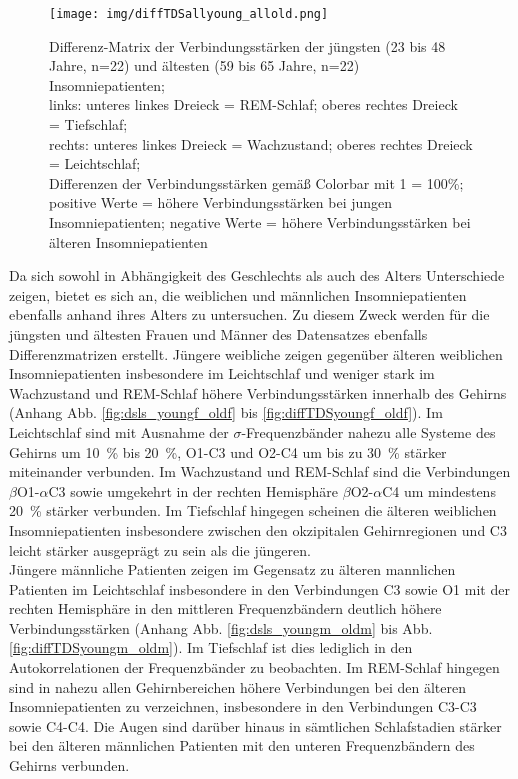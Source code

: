 \begin{figure}[H]
	\centering
	\texttt{[image: img/diffTDSallyoung\_allold.png]}
	\caption[Differenz-Matrix der Verbindungsstärken der jungen und älteren Insomniepatienten]{Differenz-Matrix der Verbindungsstärken der jüngsten (23 bis 48 Jahre, n=22) und ältesten (59 bis 65 Jahre, n=22) Insomniepatienten;\\links: unteres linkes Dreieck = REM-Schlaf; oberes rechtes Dreieck = Tiefschlaf;\\rechts: unteres linkes Dreieck = Wachzustand; oberes rechtes Dreieck = Leichtschlaf;\\Differenzen der Verbindungsstärken gemäß Colorbar mit 1 = 100\%;\\positive Werte = höhere Verbindungsstärken bei jungen Insomniepatienten; negative Werte = höhere Verbindungsstärken bei älteren Insomniepatienten}
	\label{fig:diffTDSallyoung_allold}
\end{figure}

Da sich sowohl in Abhängigkeit des Geschlechts als auch des Alters Unterschiede zeigen, bietet es sich an, die weiblichen und männlichen Insomniepatienten ebenfalls anhand ihres Alters zu untersuchen. Zu diesem Zweck werden für die jüngsten und ältesten Frauen und Männer des Datensatzes ebenfalls Differenzmatrizen erstellt. Jüngere weibliche zeigen gegenüber älteren weiblichen Insomniepatienten insbesondere im Leichtschlaf und weniger stark im Wachzustand und \acs{REM}-Schlaf höhere Verbindungsstärken innerhalb des Gehirns (Anhang Abb. \ref{fig:dsls_youngf_oldf} bis \ref{fig:diffTDSyoungf_oldf}). Im Leichtschlaf sind mit Ausnahme der $\sigma$-Frequenzbänder nahezu alle Systeme des Gehirns um 10~\% bis 20~\%, O1-C3 und O2-C4 um bis zu 30~\% stärker miteinander verbunden. Im Wachzustand und \acs{REM}-Schlaf sind die Verbindungen $\beta$O1-$\alpha$C3 sowie umgekehrt in der rechten Hemisphäre $\beta$O2-$\alpha$C4 um mindestens 20~\% stärker verbunden. Im Tiefschlaf hingegen scheinen die älteren weiblichen Insomniepatienten insbesondere zwischen den okzipitalen Gehirnregionen und C3 leicht stärker ausgeprägt zu sein als die jüngeren.\\

Jüngere männliche Patienten zeigen im Gegensatz zu älteren mannlichen Patienten im Leichtschlaf insbesondere in den Verbindungen C3 sowie O1 mit der rechten Hemisphäre in den mittleren Frequenzbändern deutlich höhere Verbindungsstärken (Anhang Abb. \ref{fig:dsls_youngm_oldm} bis Abb. \ref{fig:diffTDSyoungm_oldm}). Im Tiefschlaf ist dies lediglich in den Autokorrelationen der Frequenzbänder zu beobachten. Im \acs{REM}-Schlaf hingegen sind in nahezu allen Gehirnbereichen höhere Verbindungen bei den älteren Insomniepatienten zu verzeichnen, insbesondere in den Verbindungen C3-C3 sowie C4-C4. Die Augen sind darüber hinaus in sämtlichen Schlafstadien stärker bei den älteren männlichen Patienten mit den unteren Frequenzbändern des Gehirns verbunden.\\

